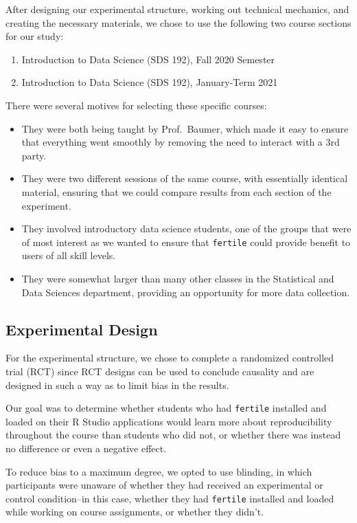 \documentclass[12pt,twoside]{reedthesis}
\providecommand{\tightlist}{%
  \setlength{\itemsep}{0pt}\setlength{\parskip}{0pt}}
\begin{document}
After designing our experimental structure, working out technical mechanics, and creating the necessary materials, we chose to use the following two course sections for our study:
\begin{enumerate}
\def\labelenumi{\arabic{enumi}.}
\tightlist
\item
  Introduction to Data Science (SDS 192), Fall 2020 Semester
\item
  Introduction to Data Science (SDS 192), January-Term 2021
\end{enumerate}
There were several motives for selecting these specific courses:
\begin{itemize}
\tightlist
\item
  They were both being taught by Prof.~Baumer, which made it easy to ensure that everything went smoothly by removing the need to interact with a 3rd party.
\item
  They were two different sessions of the same course, with essentially identical material, ensuring that we could compare results from each section of the experiment.
\item
  They involved introductory data science students, one of the groups that were of most interest as we wanted to ensure that \texttt{fertile} could provide benefit to users of all skill levels.
\item
  They were somewhat larger than many other classes in the Statistical and Data Sciences department, providing an opportunity for more data collection.
\end{itemize}
\hypertarget{experimental-design}{%
\subsection{Experimental Design}\label{experimental-design}}

For the experimental structure, we chose to complete a randomized controlled trial (RCT) since RCT designs can be used to conclude causality and are designed in such a way as to limit bias in the results.

Our goal was to determine whether students who had \texttt{fertile} installed and loaded on their R Studio applications would learn more about reproducibility throughout the course than students who did not, or whether there was instead no difference or even a negative effect.

To reduce bias to a maximum degree, we opted to use blinding, in which participants were unaware of whether they had received an experimental or control condition--in this case, whether they had \texttt{fertile} installed and loaded while working on course assignments, or whether they didn't.
\end{document}
